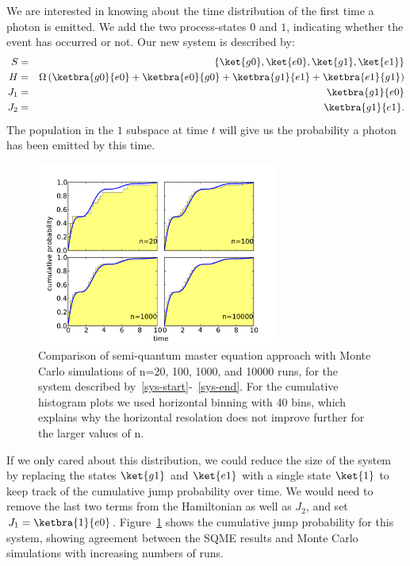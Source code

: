 We are interested in knowing about the time distribution of the first time a photon is emitted. We add the two process-states $0$ and $1$, indicating whether the event has occurred or not. Our new system is described by:
\begin{eqnarray}
  S &=& \left\{ \ket{g0}, \ket{e0}, \ket{g1}, \ket{e1} \right\} \label{sys-start} \\
  H &=& \Omega \left( \ketbra{g0}{e0} + \ketbra{e0}{g0} + \ketbra{g1}{e1} + \ketbra{e1}{g1}  \right) \\
  J_1 &=&  \ketbra{g1}{e0} \\
  J_2 &=& \ketbra{g1}{e1}. \label{sys-end}
\end{eqnarray}
The population in the $1$ subspace at time $t$ will give us the probability a photon has been emitted by this time.

\begin{figure}[htb]
  \begin{center}
  \includegraphics[width=8cm]{assets/sqme_mc_comp.pdf}
  \end{center}
  \caption{Comparison of semi-quantum master equation approach with Monte Carlo simulations of n=20, 100, 1000, and 10000 runs, for the system described by~\ref{sys-start}-~\ref{sys-end}. For the cumulative histogram plots we used horizontal binning with 40 bins, which explains why the horizontal resolation does not improve further for the larger values of n.}
  \label{sqme_mc_comp}
\end{figure}

If we only cared about this distribution, we could reduce the size of the system by replacing the states $\ket{g1}$ and $\ket{e1}$ with a single state $\ket{1}$ to keep track of the cumulative jump probability over time. We would need to remove the last two terms from the Hamiltonian as well as $J_2$, and set $J_1 =  \ketbra{1}{e0}$. Figure~\ref{sqme_mc_comp} shows the cumulative jump probability for this system, showing agreement between the SQME results and Monte Carlo simulations with increasing numbers of runs.


